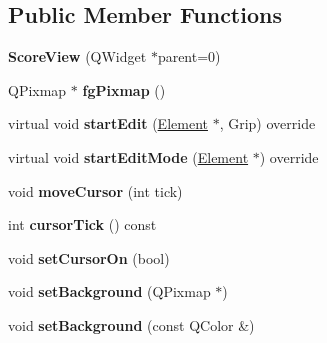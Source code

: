 \subsection*{Public Member Functions}
\begin{DoxyCompactItemize}
\item 
\mbox{\label{class_ms_1_1_score_view_a52f8ed77c3f24cce22f815325917970e}} 
{\bfseries Score\+View} (Q\+Widget $\ast$parent=0)
\item 
\mbox{\label{class_ms_1_1_score_view_a992a9a5ac3a7d9ecf918b25e9b29807c}} 
Q\+Pixmap $\ast$ {\bfseries fg\+Pixmap} ()
\item 
\mbox{\label{class_ms_1_1_score_view_a3af16702c45446768e5bf6844687d405}} 
virtual void {\bfseries start\+Edit} (\hyperlink{class_ms_1_1_element}{Element} $\ast$, Grip) override
\item 
\mbox{\label{class_ms_1_1_score_view_a83dda2a1db9e3dac327cf03ccf9c9908}} 
virtual void {\bfseries start\+Edit\+Mode} (\hyperlink{class_ms_1_1_element}{Element} $\ast$) override
\item 
\mbox{\label{class_ms_1_1_score_view_ac23e510b36061c5ad0e5dcb1c0c12549}} 
void {\bfseries move\+Cursor} (int tick)
\item 
\mbox{\label{class_ms_1_1_score_view_aaf4dfcd1d8dc17f53477532daff8acb1}} 
int {\bfseries cursor\+Tick} () const
\item 
\mbox{\label{class_ms_1_1_score_view_abad27335f8d58f3f3389683134375c57}} 
void {\bfseries set\+Cursor\+On} (bool)
\item 
\mbox{\label{class_ms_1_1_score_view_a9b6639c49b8f736a64213a0efce0cf91}} 
void {\bfseries set\+Background} (Q\+Pixmap $\ast$)
\item 
\mbox{\label{class_ms_1_1_score_view_a9e1ed16d5612310f3edaff445d0ce7db}} 
void {\bfseries set\+Background} (const Q\+Color \&)
\item 
\mbox{\label{class_ms_1_1_score_view_a97e80eb178645f767c371648ae674dd8}} 

\end{DoxyCompactItemize}
